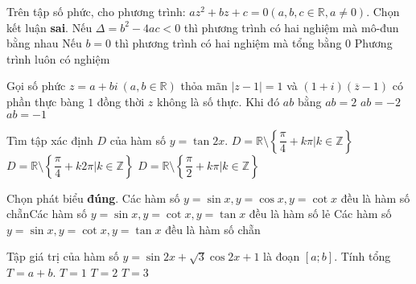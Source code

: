 	\begin{ex} %
	Trên tập số phức, cho phương trình: $az^2 + bz + c = 0 (a, b, c \in \mathbb{R}, a \ne 0)$. Chọn kết luận \textbf{sai}.
			{Nếu $\Delta = b^2 - 4ac < 0$ thì phương trình có hai nghiệm mà mô-đun bằng nhau}	{Nếu $b = 0$ thì phương trình có hai nghiệm mà tổng bằng $0$}	{Phương trình luôn có nghiệm}
	
	\end{ex}
					
	\begin{ex} %
	Gọi số phức $z = a + bi \  (a, b \in \mathbb{R})$ thỏa mãn $|z - 1| = 1$ và $(1 + i)(\overline{z} - 1)$ có phần thực bàng $1$ đồng thời $z$ không là số thực. Khi đó $ab$ bằng
			{$ab = 2$}	{$ab = -2$}	{$ab = -1$}
	
	\end{ex}
					
	\begin{ex} %
	Tìm tập xác định $D$ của hàm số $y = \tan 2x$.
			{$D = \mathbb{R} \setminus \left\{ \dfrac{\pi}{4} + k\pi | k \in \mathbb{Z} \right\}$} {$D = \mathbb{R} \setminus \left\{ \dfrac{\pi}{4} + k2\pi | k \in \mathbb{Z} \right\}$} {$D = \mathbb{R} \setminus \left\{ \dfrac{\pi}{2} + k\pi | k \in \mathbb{Z} \right\}$}
	
	\end{ex}
		\begin{ex} %
	Chọn phát biểu \textbf{đúng}.
			{Các hàm số $y = \sin x, y = \cos x, y = \cot x$ đều là hàm số chẵn}{\True Các hàm số $y = \sin x, y = \cot x, y = \tan x$ đều là hàm số lẻ}	{Các hàm số $y = \sin x, y = \cot x, y = \tan x$ đều là hàm số chẵn}
	
	\end{ex}
					
	\begin{ex} %
	Tập giá trị của hàm số $y = \sin 2x + \sqrt{3} \cos 2x + 1$ là đoạn $[a;b]$. Tính tổng $T = a + b$.
			{$T = 1$}	{\True $T = 2$}	{$T = 3$}
	
	\end{ex}
					
